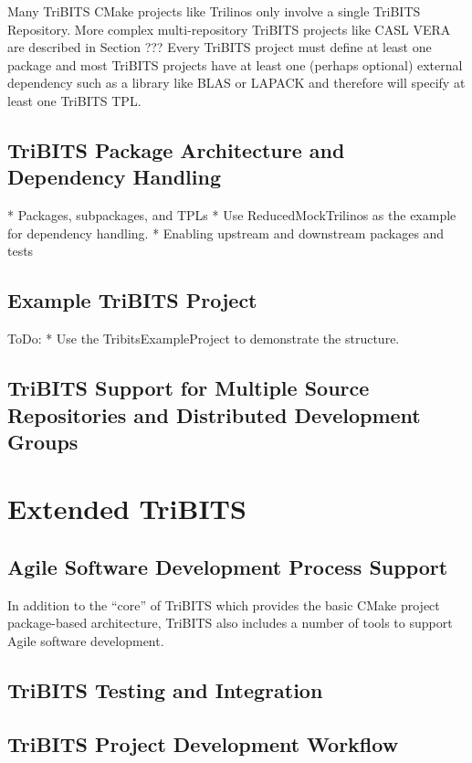 \documentclass[note]{TechNote}
\begin{document}
Many TriBITS CMake projects like Trilinos only involve a single TriBITS Repository.  More complex multi-repository TriBITS projects like CASL VERA are described in Section ???  Every TriBITS project must define at least one package and most TriBITS projects have at least one (perhaps optional) external dependency such as a library like BLAS or LAPACK and therefore will specify at least one TriBITS TPL.

%
\subsection{TriBITS Package Architecture and Dependency Handling}
%



* Packages, subpackages, and TPLs
* Use ReducedMockTrilinos as the example for dependency handling.
* Enabling upstream and downstream packages and tests

%
\subsection{Example TriBITS Project}
%

ToDo:
* Use the TribitsExampleProject to demonstrate the structure.


%
\subsection{TriBITS Support for Multiple Source Repositories and Distributed Development Groups}
%

%
\section{Extended TriBITS}
%

%
\subsection{Agile Software Development Process Support}
%

In addition to the ``core'' of TriBITS which provides the basic CMake project package-based architecture, TriBITS also includes a number of tools to support Agile software development. 


%
\subsection{TriBITS Testing and Integration}
%


%
\subsection{TriBITS Project Development Workflow}
%
\end{document}
